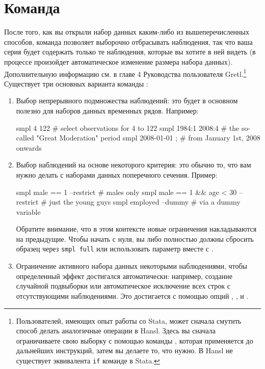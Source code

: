 \section{Команда }

После того, как вы открыли набор данных каким-либо из
вышеперечисленных способов, команда  позволяет выборочно
отбрасывать наблюдения, так что ваша серия будет содержать только те
наблюдения, которые вы хотите в ней видеть (в процессе произойдет
автоматическое изменение размера набора данных). Дополнительную
информацию см. в главе 4 Руководства пользователя
Gretl.\footnote{Пользователей, имеющих опыт работы со Stata, может
  сначала смутить способ делать аналогичные операции в Hansl. Здесь вы
  сначала ограничиваете свою выборку с помощью команды ,
  которая применяется до дальнейших инструкций, затем вы делаете то,
  что нужно. В Hansl не существует эквивалента \texttt{if} команде в
  Stata. }  Существует три основных варианта команды :

\begin{enumerate}
\item Выбор непрерывного подмножества наблюдений: это будет в основном
  полезно для наборов данных временных рядов. Например:

  \begin{code}
    smpl 4 122            # select observations for 4 to 122
    smpl 1984:1 2008:4    # the so-called "Great Moderation" period
    smpl 2008-01-01 ;     # from January 1st, 2008 onwards
  \end{code}
\item Выбор наблюдений на основе некоторого критерия: это обычно то,
  что вам нужно делать с наборами данных поперечного сечения. Пример:
  \begin{code}
    smpl male == 1 --restrict                # males only
    smpl male == 1 && age < 30 --restrict    # just the young guys
    smpl employed --dummy                    # via a dummy variable
  \end{code}
  Обратите внимание, что в этом контексте новые ограничения
  накладываются на предыдущие. Чтобы начать с нуля, вы либо полностью
  должны сбросить образец через \texttt{smpl full} или использовать
  параметр  вместе с .
\item Ограничение активного набора данных некоторыми наблюдениями,
  чтобы определенный эффект достигался автоматически: например,
  создание случайной подвыборки или автоматическое исключение всех
  строк с отсутствующими наблюдениями. Это достигается с помощью опций
  , , и .
\end{enumerate}

